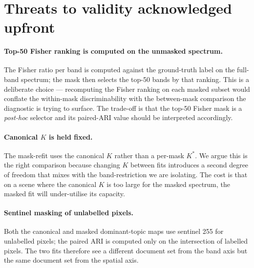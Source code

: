 \documentclass[11pt,a4paper]{article}
\begin{document}
\section{Threats to validity acknowledged upfront}

\paragraph{Top-50 Fisher ranking is computed on the unmasked
spectrum.} The Fisher ratio per band is computed against the
ground-truth label on the full-band spectrum; the mask then selects
the top-50 bands by that ranking. This is a deliberate choice ---
recomputing the Fisher ranking on each masked subset would conflate
the within-mask discriminability with the between-mask comparison
the diagnostic is trying to surface. The trade-off is that the
top-50 Fisher mask is a \emph{post-hoc} selector and its paired-ARI
value should be interpreted accordingly.

\paragraph{Canonical $K$ is held fixed.} The mask-refit uses the
canonical $K$ rather than a per-mask $K^*$. We argue this is the
right comparison because changing $K$ between fits introduces a
second degree of freedom that mixes with the band-restriction we are
isolating. The cost is that on a scene where the canonical $K$ is too
large for the masked spectrum, the masked fit will under-utilise its
capacity.

\paragraph{Sentinel masking of unlabelled pixels.} Both the canonical
and masked dominant-topic maps use sentinel 255 for unlabelled pixels;
the paired ARI is computed only on the intersection of labelled
pixels. The two fits therefore see a different document set from the
band axis but the same document set from the spatial axis.



\end{document}
